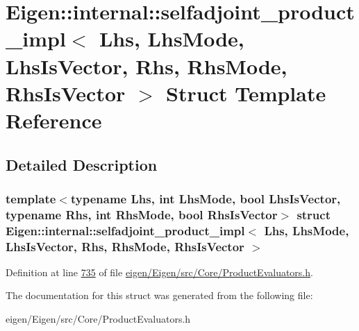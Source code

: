 \hypertarget{struct_eigen_1_1internal_1_1selfadjoint__product__impl}{}\section{Eigen\+:\+:internal\+:\+:selfadjoint\+\_\+product\+\_\+impl$<$ Lhs, Lhs\+Mode, Lhs\+Is\+Vector, Rhs, Rhs\+Mode, Rhs\+Is\+Vector $>$ Struct Template Reference}
\label{struct_eigen_1_1internal_1_1selfadjoint__product__impl}


\subsection{Detailed Description}
\subsubsection*{template$<$typename Lhs, int Lhs\+Mode, bool Lhs\+Is\+Vector, typename Rhs, int Rhs\+Mode, bool Rhs\+Is\+Vector$>$\newline
struct Eigen\+::internal\+::selfadjoint\+\_\+product\+\_\+impl$<$ Lhs, Lhs\+Mode, Lhs\+Is\+Vector, Rhs, Rhs\+Mode, Rhs\+Is\+Vector $>$}



Definition at line \hyperlink{eigen_2_eigen_2src_2_core_2_product_evaluators_8h_source_l00735}{735} of file \hyperlink{eigen_2_eigen_2src_2_core_2_product_evaluators_8h_source}{eigen/\+Eigen/src/\+Core/\+Product\+Evaluators.\+h}.



The documentation for this struct was generated from the following file\+:\begin{DoxyCompactItemize}
\item 
eigen/\+Eigen/src/\+Core/\+Product\+Evaluators.\+h\end{DoxyCompactItemize}
